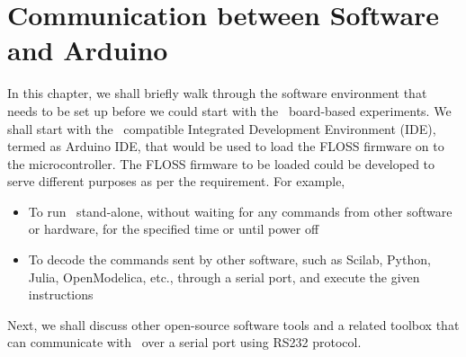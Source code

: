 \chapter{Communication between Software and Arduino}
\thispagestyle{empty}
\label{sec:sw-env}

\newcommand{\LocSWfig}{\Origin/user-code/sw-env/figures}
\newcommand{\LocSWscicode}{\Origin/user-code/sw-env/scilab}
\newcommand{\LocSWscibrief}[1]{{\texttt
                  Origin/user-code/sw-env/scilab/#1}, see \fnrefp{fn:file-loc}}
\newcommand{\LocSWardcode}{\Origin/user-code/sw-env/arduino}
\newcommand{\LocSWardbrief}[1]{{\tt \seqsplit{
                        Origin/user-code/sw-env/arduino/#1}}, see \fnrefp{fn:file-loc}}

\newcommand{\LocSWchkcode}{\Origin/tools/scilab}
\newcommand{\LocSWchkbrief}[1]{{\tt \seqsplit{
                        Origin/tools/scilab/#1}}, see \fnrefp{fn:file-loc}}
\newcommand{\LocSWfirmcode}{\Origin/tools/floss-firmware}
\newcommand{\LocSWfirmbrief}[1]{{\tt \seqsplit{
                        Origin/tools/floss-firmware/#1}}, see \fnrefp{fn:file-loc}}

\newcommand{\LocFIMpycode}{\Origin/tools/python}  %
\newcommand{\LocFIMpybrief}[1]{{\tt \seqsplit{%
                        Origin/tools/python/#1}}, see \fnrefp{fn:file-loc}} %


\newcommand{\LocFIMjuliacode}{\Origin/tools/julia}  %
\newcommand{\LocFIMjuliabrief}[1]{{\tt \seqsplit{%
                        Origin/tools/julia/#1}}, see \fnrefp{fn:file-loc}} %

\newcommand{\LocFIMOpenModelicacode}{\Origin/tools/openmodelica/windows/}  %
\newcommand{\LocFIMOpenModelicabrief}[1]{{\tt \seqsplit{%
                        Origin/tools/openmodelica/windows/#1}}, see \fnrefp{fn:file-loc}} %



In this chapter, we shall briefly walk through the software
environment that needs to be set up before we could start with the
\arduino\ board-based experiments. We shall start with the \arduino\
compatible Integrated Development Environment (IDE), termed as Arduino
IDE, that would be used to load the FLOSS firmware on to the
microcontroller. The FLOSS firmware to be loaded could be developed to serve
different purposes as per the requirement. For example, 
\begin{itemize}
      \item To run \arduino\ stand-alone, without waiting for any commands
            from other software or hardware, for the specified time or until
            power off
      \item To decode the commands sent by other software, such as Scilab, Python, 
            Julia, OpenModelica, etc., through a serial port, and 
            execute the given instructions %
\end{itemize}
Next, we shall discuss other open-source software
tools and a related toolbox that can communicate with \arduino\ 
over a serial port using RS232 protocol. 

